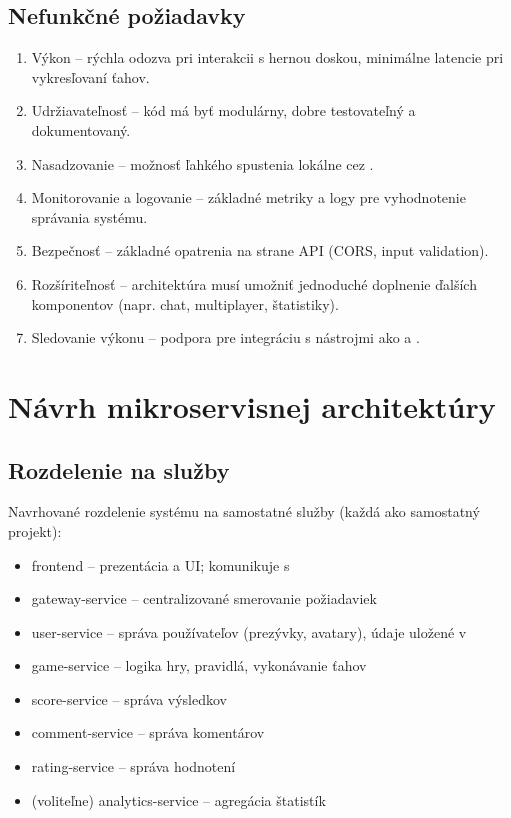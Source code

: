 \subsection{Nefunkčné požiadavky}
\begin{enumerate}
    \item Výkon – rýchla odozva pri interakcii s hernou doskou, minimálne latencie pri vykresľovaní ťahov.
    \item Udržiavateľnosť – kód má byť modulárny, dobre testovateľný a dokumentovaný.
    \item Nasadzovanie – možnosť ľahkého spustenia lokálne cez .
    \item Monitorovanie a logovanie – základné metriky a logy pre vyhodnotenie správania systému.
    \item Bezpečnosť – základné opatrenia na strane API (CORS, input validation).
    \item Rozšíriteľnosť – architektúra musí umožniť jednoduché doplnenie ďalších komponentov (napr. chat, multiplayer, štatistiky).
    \item Sledovanie výkonu – podpora pre integráciu s nástrojmi ako  a .
\end{enumerate}

\section{Návrh mikroservisnej architektúry}
\subsection{Rozdelenie na služby}
Navrhované rozdelenie systému na samostatné služby (každá ako samostatný  projekt):
\begin{itemize}
    \item frontend – prezentácia a UI; komunikuje s 
    \item gateway-service – centralizované smerovanie požiadaviek
    \item user-service – správa používateľov (prezývky, avatary), údaje uložené v 
    \item game-service – logika hry, pravidlá, vykonávanie ťahov
    \item score-service – správa výsledkov
    \item comment-service – správa komentárov
    \item rating-service – správa hodnotení
    \item (voliteľne) analytics-service – agregácia štatistík
\end{itemize}

